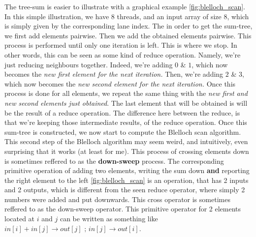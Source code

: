 The tree-sum is easier to illustrate with a graphical example \autoref{fig:blelloch_scan}. In this simple illustration, 
we have 8 threads, and an input array of size 8, which is simply given by the corresponding lane index.
The in order to get the sum-tree, we first add elements pairwise. Then we add the obtained elements pairwise. 
This process is performed until only one iteration is left. This is where we stop. In other words, this 
can be seen as some kind of reduce operation. Namely, we're just reducing neighbours together. Indeed, 
we're adding $0$ \& $1$, which now becomes the \textit{new first element for the next iteration.} Then, 
we're adding $2$ \& $3$, which now becomes the \textit{new second element for the next iteration.} Once 
this process is done for all elements, we repeat the same thing with the \textit{new first and new second elements just obtained}.
The last element that will be obtained is will be the result of a reduce operation. The difference here between the reduce, is that 
we're keeping those intermediate results, of the reduce operation.
Once this sum-tree is constructed, we now start to compute the Blelloch scan algorithm. This second step of 
the Blelloch algorithm may seem weird, and intuitively, even surprising that it works (at least for me). 
This process of crossing elements down is sometimes reffered to as the \textbf{down-sweep} process. The corresponding 
primitive operation of adding two elements, writing the sum down \textbf{and} reporting the right element to the left \autoref{fig:blelloch_scan} is 
an operation, that has 2 inputs and 2 outputs, which is different from the seen reduce operator, where simply 2 numbers were added and put downwards.
This cross operator is sometimes reffered to as the down-sweep operator. This primitive operator for 2 elements located at $i$ and $j$ 
can be written as something like $in[i] + in[j] \xrightarrow{} out[j]\text{ ; } in[j] \xrightarrow{} out[i]$. 

























